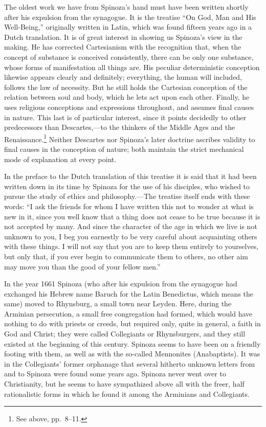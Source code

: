 \documentclass[12pt]{book}
\newcommand{\opage}[1]{\marginnote{\footnotesize\textit{[#1]}}}
\begin{document}
The oldest work we have from Spinoza's hand must have been written shortly after his
expulsion from the synagogue. It is the treatise ``On God, Man and His Well-Being,''
originally written in Latin, which was found fifteen years ago in a Dutch translation.
It is of great interest in showing us Spinoza's view in the making. He has corrected
Cartesianism with the recognition that, when the concept of substance is conceived
consistently, there can be only one substance, whose forms of manifestation all things
are. His peculiar deterministic conception likewise appears clearly and definitely;
everything, the human \opage{27}will included, follows the law of necessity. But he
still holds the Cartesian conception of the relation between soul and body, which he
lets act upon each other. Finally, he uses religious conceptions and expressions
throughout, and assumes final causes in nature. This last is of particular interest,
since it points decidedly to other predecessors than Descartes,---to the thinkers of
the Middle Ages and the Renaissance.\footnote{See above, pp.~8--11.} Neither Descartes
nor Spinoza's later doctrine ascribes validity to final causes in the conception of
nature; both maintain the strict mechanical mode of explanation at every point.

In the preface to the Dutch translation of this treatise it is said that it had been
written down in its time by Spinoza for the use of his disciples, who wished to pursue
the study of ethics and philosophy.---The treatise itself ends with these words: ``I
ask the friends for whom I have written this not to wonder at what is new in it, since
you well know that a thing does not cease to be true because it is not accepted by
many. And since the character of the age in which we live is not unknown to you, I beg
you earnestly to be very careful about acquainting others with these things. I will
not say that you are to keep them entirely to yourselves, but only that, if you ever
begin to communicate them to others, no other aim may move you than the good of your
fellow men.''

In the year 1661 Spinoza (who after his expulsion from the synagogue had exchanged his
Hebrew name \opage{28}Baruch for the Latin Benedictus, which means the same) moved to
Rhynsburg, a small town near Leyden. Here, during the Arminian persecution, a small
free congregation had formed, which would have nothing to do with priests or creeds,
but required only, quite in general, a faith in God and Christ; they were called
Collegiants or Rhynsburgers, and they still existed at the beginning of this century.
Spinoza seems to have been on a friendly footing with them, as well as with the
so-called Mennonites (Anabaptists). It was in the Collegiants' former orphanage that
several hitherto unknown letters from and to Spinoza were found some years ago.
Spinoza never went over to Christianity, but he seems to have sympathized above all
with the freer, half rationalistic forms in which he found it among the Arminians and
Collegiants.
\end{document}
